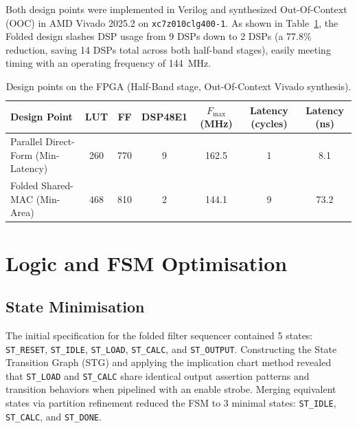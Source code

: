 \documentclass[11pt,a4paper]{article}
\begin{document}
Both design points were implemented in Verilog and synthesized Out-Of-Context (OOC) in AMD Vivado 2025.2 on \texttt{xc7z010clg400-1}. As shown in Table~\ref{tab:designpoints}, the Folded design slashes DSP usage from 9 DSPs down to 2 DSPs (a 77.8\% reduction, saving 14 DSPs total across both half-band stages), easily meeting timing with an operating frequency of 144~MHz.

\begin{table}[H]\centering\small
\caption{Design points on the FPGA (Half-Band stage, Out-Of-Context Vivado synthesis).}\label{tab:designpoints}
\begin{tabular}{@{}lcccccc@{}}
\toprule
Design Point & LUT & FF & DSP48E1 & $F_{\text{max}}$ (MHz) & Latency (cycles) & Latency (ns)\\
\midrule
Parallel Direct-Form (Min-Latency) & 260 & 770 & 9 & 162.5 & 1 & 8.1\\
Folded Shared-MAC (Min-Area)       & 468 & 810 & 2 & 144.1 & 9 & 73.2\\
\bottomrule
\end{tabular}
\end{table}

\section{Logic and FSM Optimisation}
\label{sec:logic}

\subsection{State Minimisation}
The initial specification for the folded filter sequencer contained 5 states: \texttt{ST\_RESET}, \texttt{ST\_IDLE}, \texttt{ST\_LOAD}, \texttt{ST\_CALC}, and \texttt{ST\_OUTPUT}. Constructing the State Transition Graph (STG) and applying the implication chart method revealed that \texttt{ST\_LOAD} and \texttt{ST\_CALC} share identical output assertion patterns and transition behaviors when pipelined with an enable strobe. Merging equivalent states via partition refinement reduced the FSM to 3 minimal states: \texttt{ST\_IDLE}, \texttt{ST\_CALC}, and \texttt{ST\_DONE}.
\end{document}
